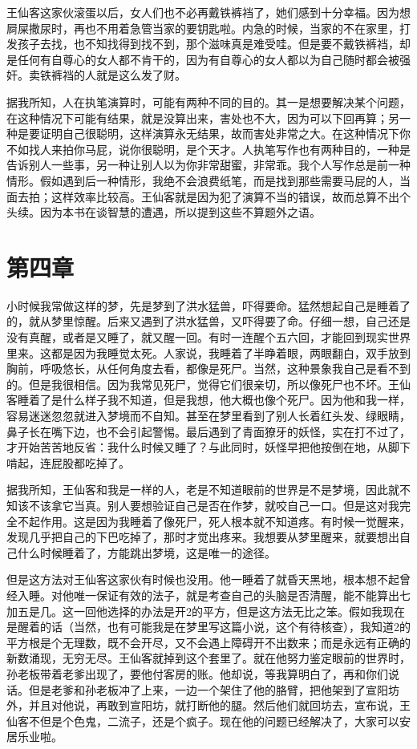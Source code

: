 王仙客这家伙滚蛋以后，女人们也不必再戴铁裤裆了，她们感到十分幸福。因为想屙屎撒尿时，再也不用着急管当家的要钥匙啦。内急的时候，当家的不在家里，打发孩子去找，也不知找得到找不到，那个滋味真是难受哇。但是要不戴铁裤裆，却是任何有自尊心的女人都不肯干的，因为有自尊心的女人都以为自己随时都会被强奸。卖铁裤裆的人就是这么发了财。 

据我所知，人在执笔演算时，可能有两种不同的目的。其一是想要解决某个问题，在这种情况下可能有结果，就是没算出来，害处也不大，因为可以下回再算；另一种是要证明自己很聪明，这样演算永无结果，故而害处非常之大。在这种情况下你不如找人来拍你马屁，说你很聪明，是个天才。人执笔写作也有两种目的，一种是告诉别人一些事，另一种让别人以为你非常甜蜜，非常乖。我个人写作总是前一种情形。假如遇到后一种情形，我绝不会浪费纸笔，而是找到那些需要马屁的人，当面去拍；这样效率比较高。王仙客就是因为犯了演算不当的错误，故而总算不出个头续。因为本书在谈智慧的遭遇，所以提到这些不算题外之语。 


\section{第四章}

小时候我常做这样的梦，先是梦到了洪水猛兽，吓得要命。猛然想起自己是睡着了的，就从梦里惊醒。后来又遇到了洪水猛兽，又吓得要了命。仔细一想，自己还是没有真醒，或者是又睡了，就又醒一回。有时一连醒个五六回，才能回到现实世界里来。这都是因为我睡觉太死。人家说，我睡着了半睁着眼，两眼翻白，双手放到胸前，呼吸悠长，从任何角度去看，都像是死尸。当然，这种景象我自己是看不到的。但是我很相信。因为我常见死尸，觉得它们很亲切，所以像死尸也不坏。王仙客睡着了是什么样子我不知道，但是我想，他大概也像个死尸。因为他和我一样，容易迷迷忽忽就进入梦境而不自知。甚至在梦里看到了别人长着红头发、绿眼睛，鼻子长在嘴下边，也不会引起警惕。最后遇到了青面獠牙的妖怪，实在打不过了，才开始苦苦地反省：我什么时候又睡了？与此同时，妖怪早把他按倒在地，从脚下啃起，连屁股都吃掉了。 

据我所知，王仙客和我是一样的人，老是不知道眼前的世界是不是梦境，因此就不知该不该拿它当真。别人要想验证自己是否在作梦，就咬自己一口。但是这对我完全不起作用。这是因为我睡着了像死尸，死人根本就不知道疼。有时候一觉醒来，发现几乎把自己的下巴吃掉了，那时才觉出疼来。我想要从梦里醒来，就要想出自己什么时候睡着了，方能跳出梦境，这是唯一的途径。 

但是这方法对王仙客这家伙有时候也没用。他一睡着了就昏天黑地，根本想不起曾经入睡。对他唯一保证有效的法子，就是考查自己的头脑是否清醒，能不能算出七加五是几。这一回他选择的办法是开2的平方，但是这方法无比之笨。假如我现在是醒着的话（当然，也有可能我是在梦里写这篇小说，这个有待核查），我知道2的平方根是个无理数，既不会开尽，又不会遇上障碍开不出数来；而是永远有正确的新数涌现，无穷无尽。王仙客就掉到这个套里了。就在他努力鉴定眼前的世界时，孙老板带着老爹出现了，要他付客房的账。他却说，等我算明白了，再和你们说话。但是老爹和孙老板冲了上来，一边一个架住了他的胳臂，把他架到了宣阳坊外，并且对他说，再敢到宣阳坊，就打断他的腿。然后他们就回坊去，宣布说，王仙客不但是个色鬼，二流子，还是个疯子。现在他的问题已经解决了，大家可以安居乐业啦。 

